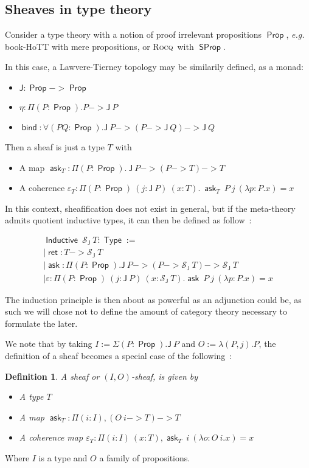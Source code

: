 \documentclass[11pt]{article}
\newtheorem{definition}[theorem]{Definition}
\DeclareMathOperator{\Prop}{\mathsf{Prop}}
\DeclareMathOperator{\SProp}{\mathsf{SProp}}
\DeclareMathOperator{\Type}{\mathsf{Type}}
\DeclareMathOperator{\ask}{\mathsf{ask}}
\DeclareMathOperator{\bind}{\mathsf{bind}}
\DeclareMathOperator{\Inductive}{\mathsf{Inductive}}
\DeclareMathOperator{\ret}{\mathsf{ret}}
\newcommand{\0}{\mathbf{0}}
\newcommand{\1}{\mathbf{1}}
\newcommand{\rocq}{\textsc{Rocq}}
\begin{document}
\subsection{Sheaves in type theory}\label{shfinTT}

Consider a type theory with a notion of proof irrelevant propositions $\Prop$, \emph{e.g.} book-HoTT with mere propositions, or \rocq\ with $\SProp$.

In this case, a Lawvere-Tierney topology may be similarily defined, as a monad:
\begin{itemize}
    \item $\mathsf{J} : \Prop -> \Prop$
    \item $\eta : \Pi (P:\Prop).P -> \mathsf{J}\ P$
    \item $\bind : \forall (P Q: \Prop). \mathsf{J}\ P -> (P -> \mathsf{J}\ Q) -> \mathsf{J}\ Q$
\end{itemize}

Then a sheaf is just a type $T$ with 
\begin{itemize}
    \item A map $\ask_T : \Pi (P:\Prop).\ \mathsf{J}\ P -> (P -> T) -> T$
    \item A coherence $\varepsilon_T : \Pi (P:\Prop)\ (j : \mathsf{J}\ P)\ (x:T).\ \ask_T\ P\ j\ (\lambda p:P.x) = x$
\end{itemize}

In this context, sheafification does not exist in general, but if the meta-theory admits quotient inductive types, it can then be defined as follow~:

$$
\begin{array}{l}
    \Inductive\ \mathcal{S}_{\mathsf{J}}\ T : \Type := \\
    \mid \ret : T -> \mathcal{S}_{\mathsf{J}}\ T\\
    \mid \ask : \Pi (P:\Prop). \mathsf{J}\ P -> (P -> \mathcal{S}_{\mathsf{J}}\ T) -> \mathcal{S}_{\mathsf{J}}\ T\\
    \mid \varepsilon : \Pi (P:\Prop)\ (j : \mathsf J\ P)\ (x : \mathcal{S}_{\mathsf{J}}\ T). \ask\ P\ j\ (\lambda p:P. x) = x
\end{array}
$$

The induction principle is then about as powerful as an adjunction could be, as such we will chose not to define the amount of category theory necessary to formulate the later.

We note that by taking $I := \Sigma (P:\Prop). \mathsf{J}\ P$ and $O:=\lambda (P,j).P$, the definition of a sheaf becomes a special case of the following~:
\begin{definition}\label{IOshf}
    A \emph{sheaf} or \emph{$(I,O)$-sheaf}, is given by
\begin{itemize}
    \item A type $T$
    \item A map $\ask_T : \Pi (i:I), (O\ i -> T) -> T$
    \item A coherence map $\varepsilon_T : \Pi(i:I)\ (x:T), \ask_T\ i\ (\lambda o:O\  i.x) = x$
\end{itemize}

\end{definition}
Where $I$ is a type and $O$ a family of propositions.
\end{document}
